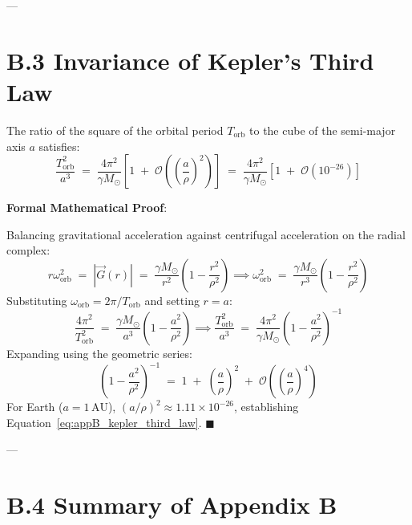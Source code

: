 \documentclass[
    12pt,
    a4paper,
    headings=normal,
    twoside=false,
    open=any,
    parskip=half
]{scrbook}
\newenvironment{myproof}[1][]{%
  \par\vspace{6pt}\noindent\textbf{\sffamily\color{maincolor}Formal Mathematical Proof\ifstrempty{#1}{}{ (#1)}}:\par\nopagebreak
}{%
  \penalty50\hfill\ensuremath{\blacksquare}\par\vspace{6pt}
}
\begin{document}
---

\section{B.3 Invariance of Kepler's Third Law}
\label{sec:appB_kepler_third_law}

\begin{phystheorem}\label{thm:appB_kepler_third_law_invariance}
The ratio of the square of the orbital period $T_{\text{orb}}$ to the cube of the semi-major axis $a$ satisfies:
\begin{equation}
\boxed{\frac{T_{\text{orb}}^2}{a^3} \;=\; \frac{4\pi^2}{\gamma M_\odot} \left[ 1 \;+\; \mathcal{O}\left( \left(\frac{a}{\rho}\right)^2 \right) \right] \;=\; \frac{4\pi^2}{\gamma M_\odot} \left[ 1 \;+\; \mathcal{O}(10^{-26}) \right]}
\label{eq:appB_kepler_third_law}
\end{equation}
\end{phystheorem}

\begin{myproof}
Balancing gravitational acceleration against centrifugal acceleration on the radial complex:
\begin{equation*}
r \omega_{\text{orb}}^2 \;=\; |\vec{G}(r)| \;=\; \frac{\gamma M_\odot}{r^2}\left( 1 - \frac{r^2}{\rho^2} \right) \implies \omega_{\text{orb}}^2 \;=\; \frac{\gamma M_\odot}{r^3}\left( 1 - \frac{r^2}{\rho^2} \right)
\end{equation*}
Substituting $\omega_{\text{orb}} = 2\pi / T_{\text{orb}}$ and setting $r = a$:
\begin{equation*}
\frac{4\pi^2}{T_{\text{orb}}^2} \;=\; \frac{\gamma M_\odot}{a^3}\left( 1 - \frac{a^2}{\rho^2} \right) \implies \frac{T_{\text{orb}}^2}{a^3} \;=\; \frac{4\pi^2}{\gamma M_\odot}\left( 1 - \frac{a^2}{\rho^2} \right)^{-1}
\end{equation*}
Expanding using the geometric series:
\begin{equation*}
\left( 1 - \frac{a^2}{\rho^2} \right)^{-1} \;=\; 1 \;+\; \left(\frac{a}{\rho}\right)^2 \;+\; \mathcal{O}\left( \left(\frac{a}{\rho}\right)^4 \right)
\end{equation*}
For Earth ($a = 1\,\text{AU}$), $(a/\rho)^2 \approx 1.11 \times 10^{-26}$, establishing Equation~\eqref{eq:appB_kepler_third_law}.
\end{myproof}

---

\section{B.4 Summary of Appendix B}
\label{sec:appB_summary}
\end{document}
